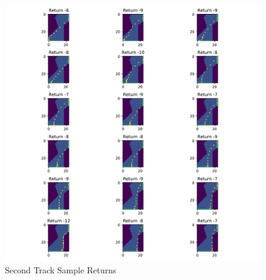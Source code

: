 \documentclass{article}
\begin{document}
\begin{figure}
	\includegraphics[width=\textwidth]{two}
	\centering
	\caption{\label{fig:track_two} Second Track Sample Returns}
\end{figure}
\end{document}
